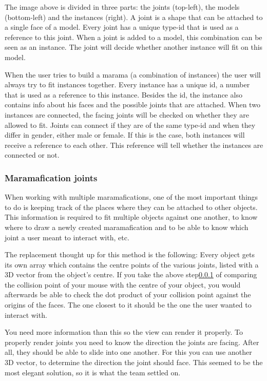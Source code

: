 \documentclass[10pt]{extarticle} %
\begin{document}
    The image above is divided in three parts: the joints (top-left), the models (bottom-left) and the instances (right).
    A joint is a shape that can be attached to a single face of a model.
    Every joint has a unique type-id that is used as a reference to this joint.
    When a joint is added to a model, this combination can be seen as an instance.
    The joint will decide whether another instance will fit on this model.

    When the user tries to build a marama (a combination of instances) the user will always try to fit instances together.
    Every instance has a unique id, a number that is used as a reference to this instance.
    Besides the id, the instance also contains info about his faces and the possible joints that are attached.
    When two instances are connected, the facing joints will be checked on whether they are allowed to fit.
    Joints can connect if they are of the same type-id and when they differ in gender, either male or female.
    If this is the case, both instances will receive a reference to each other.
    This reference will tell whether the instances are connected or not.


    \subsubsection{Maramafication joints}
    When working with multiple maramafications, one of the most important things to do is keeping track of the places where they can be attached to other objects.
    This information is required to fit multiple objects against one another, to know where to draw a newly created maramafication and to be able to know which joint a user meant to interact with, etc.

    The replacement thought up for this method is the following:
    Every object gets its own array which contains the centre points of the various joints, listed with a 3D vector from the object's centre.
    If you take the above step\ref{} of comparing the collision point of your mouse with the centre of your object, you would afterwards be able to check the dot product of your collision point against the origins of the faces.
    The one closest to it should be the one the user wanted to interact with.

    You need more information than this so the view can render it properly.
    To properly render joints you need to know the direction the joints are facing.
    After all, they should be able to slide into one another.
    For this you can use another 3D vector, to determine the direction the joint should face.
    This seemed to be the most elegant solution, so it is what the team settled on.
\end{document}

